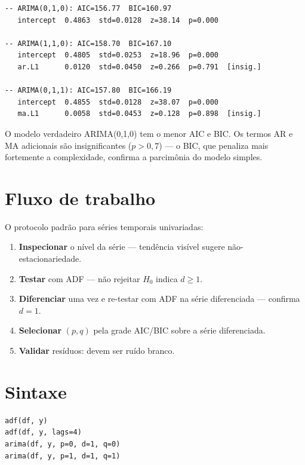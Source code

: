\begin{lstlisting}[language={}, basicstyle=\ttfamily\small,
  frame=none, numbers=none, backgroundcolor=\color{codbg},
  xleftmargin=0pt, xrightmargin=0pt, breaklines=false]
-- ARIMA(0,1,0): AIC=156.77  BIC=160.97
   intercept  0.4863  std=0.0128  z=38.14  p=0.000

-- ARIMA(1,1,0): AIC=158.70  BIC=167.10
   intercept  0.4805  std=0.0253  z=18.96  p=0.000
   ar.L1      0.0120  std=0.0450  z=0.266  p=0.791  [insig.]

-- ARIMA(0,1,1): AIC=157.80  BIC=166.19
   intercept  0.4855  std=0.0128  z=38.07  p=0.000
   ma.L1      0.0058  std=0.0453  z=0.128  p=0.898  [insig.]
\end{lstlisting}

O modelo verdadeiro ARIMA(0,1,0) tem o menor AIC e BIC. Os termos AR e MA
adicionais são insignificantes ($p > 0{,}7$) — o BIC, que penaliza mais
fortemente a complexidade, confirma a parcimônia do modelo simples.

\section{Fluxo de trabalho}

O protocolo padrão para séries temporais univariadas:

\begin{enumerate}
  \item \textbf{Inspecionar} o nível da série — tendência visível sugere
        não-estacionariedade.
  \item \textbf{Testar} com ADF — não rejeitar $H_0$ indica $d \geq 1$.
  \item \textbf{Diferenciar} uma vez e re-testar com ADF na série
        diferenciada — confirma $d=1$.
  \item \textbf{Selecionar} $(p,q)$ pela grade AIC/BIC sobre a série
        diferenciada.
  \item \textbf{Validar} resíduos: devem ser ruído branco.
\end{enumerate}

\section{Sintaxe}

\begin{lstlisting}
adf(df, y)
adf(df, y, lags=4)
arima(df, y, p=0, d=1, q=0)
arima(df, y, p=1, d=1, q=1)
\end{lstlisting}

